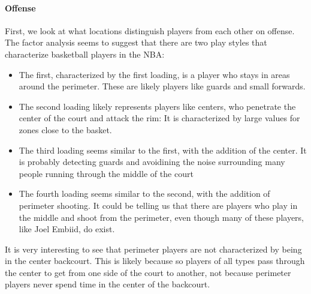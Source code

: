\documentclass[]{article}
\let\oldparagraph\paragraph
\renewcommand{\paragraph}[1]{\oldparagraph{#1}\mbox{}}
\begin{document}
\hypertarget{offense}{%
\paragraph{Offense}\label{offense}}

First, we look at what locations distinguish players from each other on
offense. The factor analysis seems to suggest that there are two play
styles that characterize basketball players in the NBA:

\begin{itemize}
\item
  The first, characterized by the first loading, is a player who stays
  in areas around the perimeter. These are likely players like guards
  and small forwards.
\item
  The second loading likely represents players like centers, who
  penetrate the center of the court and attack the rim: It is
  characterized by large values for zones close to the basket.
\item
  The third loading seems similar to the first, with the addition of the
  center. It is probably detecting guards and avoidining the noise
  surrounding many people running through the middle of the court
\item
  The fourth loading seems similar to the second, with the addition of
  perimeter shooting. It could be telling us that there are players who
  play in the middle and shoot from the perimeter, even though many of
  these players, like Joel Embiid, do exist.
\end{itemize}

It is very interesting to see that perimeter players are not
characterized by being in the center backcourt. This is likely because
so players of all types pass through the center to get from one side of
the court to another, not because perimeter players never spend time in
the center of the backcourt.
\end{document}

